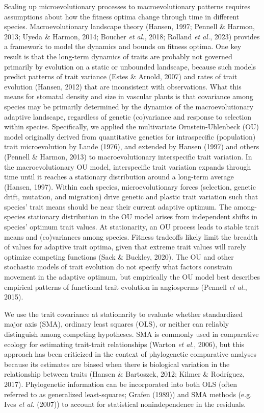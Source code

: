 \documentclass[
  letterpaper,
  DIV=11,
  numbers=noendperiod]{scrartcl}
\begin{document}
Scaling up microevolutionary processes to macroevolutionary patterns
requires assumptions about how the fitness optima change through time in
different species. Macroevolutionary landscape theory (Hansen, 1997;
Pennell \& Harmon, 2013; Uyeda \& Harmon, 2014; Boucher \emph{et al.},
2018; Rolland \emph{et al.}, 2023) provides a framework to model the
dynamics and bounds on fitness optima. One key result is that the
long-term dynamics of traits are probably not governed primarily by
evolution on a static or unbounded landscape, because such models
predict patterns of trait variance (Estes \& Arnold, 2007) and rates of
trait evolution (Hansen, 2012) that are inconsistent with observations.
What this means for stomatal density and size in vascular plants is that
covariance among species may be primarily determined by the dynamics of
the macroevolutionary adaptive landscape, regardless of genetic
(co)variance and response to selection within species. Specifically, we
applied the multivariate Ornstein-Uhlenbeck (OU) model originally
derived from quantitative genetics for intraspecific (population) trait
microevolution by Lande (1976), and extended by Hansen (1997) and others
(Pennell \& Harmon, 2013) to macroevolutionary interspecific trait
variation. In the macroevolutionary OU model, interspecific trait
variation expands through time until it reaches a stationary
distribution around a long-term average (Hansen, 1997). Within each
species, microevolutionary forces (selection, genetic drift, mutation,
and migration) drive genetic and plastic trait variation such that
species' trait means should be near their current adaptive optimum. The
among-species stationary distribution in the OU model arises from
independent shifts in species' optimum trait values. At stationarity, an
OU process leads to stable trait means and (co)variances among species.
Fitness tradeoffs likely limit the breadth of values for adaptive trait
optima, given that extreme trait values will rarely optimize competing
functions (Sack \& Buckley, 2020). The OU and other stochastic models of
trait evolution do not specify what factors constrain movement in the
adaptive optimum, but empirically the OU model best describes empirical
patterns of functional trait evolution in angiosperms (Pennell \emph{et
al.}, 2015).

We use the trait covariance at stationarity to evaluate whether
standardized major axis (SMA), ordinary least squares (OLS), or neither
can reliably distinguish among competing hypotheses. SMA is commonly
used in comparative ecology for estimating trait-trait relationships
(Warton \emph{et al.}, 2006), but this approach has been criticized in
the context of phylogenetic comparative analyses because its estimates
are biased when there is biological variation in the relationship
between traits (Hansen \& Bartoszek, 2012; Kilmer \& Rodríguez, 2017).
Phylogenetic information can be incorporated into both OLS (often
referred to as generalized least-squares; Grafen (1989)) and SMA methods
(e.g. Ives \emph{et al.} (2007)) to account for statistical
nonindependence in the residuals.
\end{document}
